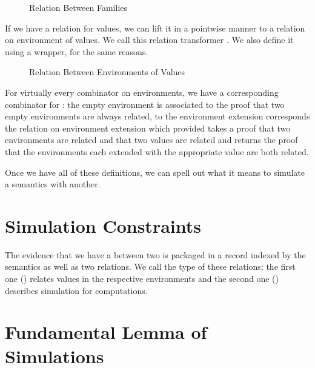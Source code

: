 \begin{figure}[h]
\caption{Relation Between  Families}
\end{figure}

If we have a relation for values, we can lift it in a pointwise manner to a relation
on environment of values. We call this relation transformer . We also define
it using a  wrapper, for the same reasons.

\begin{figure}[h]
\caption{Relation Between Environments of Values}
\end{figure}

For virtually every combinator on environments, we have a corresponding combinator
for : the empty environment  is associated to  the proof that
two empty environments are always related, to the environment extension  
corresponds the relation on environment extension  which provided takes a
proof that two environments are related and that two values are related and returns
the proof that the environments each extended with the appropriate value are both
related.

Once we have all of these definitions, we can spell out what it means to simulate
a semantics with another.

\section{Simulation Constraints}

The evidence that we have a  between two  is
packaged in a record indexed by the semantics as well as two relations.
We call  the type of these relations; the first one ()
relates values in the respective environments and the second one ()
describes simulation for computations.




\section{Fundamental Lemma of Simulations}

